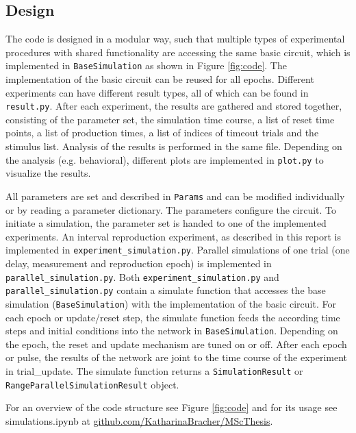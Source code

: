 \documentclass[10pt]{article}
\begin{document}


\subsection{Design}
The code is designed in a modular way, such that multiple types of experimental procedures with shared functionality are accessing the same basic circuit, which is implemented in \texttt{BaseSimulation} as shown in Figure \ref{fig:code}.
The implementation of the basic circuit can be reused for all epochs.
Different experiments can have different result types, all of which can be found in \texttt{result.py}. After each experiment, the results are gathered and stored together, consisting of the parameter set, the simulation time course, a list of reset time points, a list of production times, a list of indices of timeout trials and the stimulus list.
Analysis of the results is performed in the same file. Depending on the analysis (e.g. behavioral), different plots are implemented in \texttt{plot.py} to visualize the results. 

All parameters are set and described in \texttt{Params} and can be modified individually or by reading a parameter dictionary. The parameters configure the circuit. 
To initiate a simulation, the parameter set is handed to one of the implemented experiments. 
An interval reproduction experiment, as described in this report is implemented in \texttt{experiment\_simulation.py}. 
Parallel simulations of one trial (one delay, measurement and reproduction epoch) is implemented in \texttt{parallel\_simulation.py}.
Both \texttt{experiment\_simulation.py} and \texttt{parallel\_simulation.py} contain a simulate function that accesses the base simulation (\texttt{BaseSimulation}) with the implementation of the basic circuit.
For each epoch or update/reset step, the simulate function feeds the according time steps and initial conditions into the network in \texttt{BaseSimulation}. Depending on the epoch, the reset and update mechanism are tuned on or off. 
After each epoch or pulse, the results of the network are joint to the time course of the experiment in trial\_update. The simulate function returns a \texttt{SimulationResult} or \texttt{RangeParallelSimulationResult} object.

For an overview of the code structure see Figure \ref{fig:code} and for its usage see simulations.ipynb at \href{https://github.com/KatharinaBracher/MScThesis}{github.com/KatharinaBracher/MScThesis}. 
\end{document}
